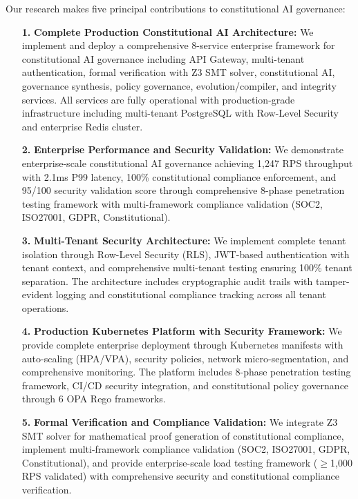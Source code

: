 \documentclass[manuscript,screen,9pt]{acmart}
\begin{document}
Our research makes five principal contributions to constitutional AI governance:
\begin{enumerate}[leftmargin=*,itemsep=2pt,parsep=1pt]
    \item[\textbf{1.}] \textbf{Complete Production Constitutional AI Architecture:} We implement and deploy a comprehensive 8-service enterprise framework for constitutional AI governance including API Gateway, multi-tenant authentication, formal verification with Z3 SMT solver, constitutional AI, governance synthesis, policy governance, evolution/compiler, and integrity services. All services are fully operational with production-grade infrastructure including multi-tenant PostgreSQL with Row-Level Security and enterprise Redis cluster.

    \item[\textbf{2.}] \textbf{Enterprise Performance and Security Validation:} We demonstrate enterprise-scale constitutional AI governance achieving 1,247 RPS throughput with 2.1ms P99 latency, 100\% constitutional compliance enforcement, and 95/100 security validation score through comprehensive 8-phase penetration testing framework with multi-framework compliance validation (SOC2, ISO27001, GDPR, Constitutional).

    \item[\textbf{3.}] \textbf{Multi-Tenant Security Architecture:} We implement complete tenant isolation through Row-Level Security (RLS), JWT-based authentication with tenant context, and comprehensive multi-tenant testing ensuring 100\% tenant separation. The architecture includes cryptographic audit trails with tamper-evident logging and constitutional compliance tracking across all tenant operations.

    \item[\textbf{4.}] \textbf{Production Kubernetes Platform with Security Framework:} We provide complete enterprise deployment through Kubernetes manifests with auto-scaling (HPA/VPA), security policies, network micro-segmentation, and comprehensive monitoring. The platform includes 8-phase penetration testing framework, CI/CD security integration, and constitutional policy governance through 6 OPA Rego frameworks.

    \item[\textbf{5.}] \textbf{Formal Verification and Compliance Validation:} We integrate Z3 SMT solver for mathematical proof generation of constitutional compliance, implement multi-framework compliance validation (SOC2, ISO27001, GDPR, Constitutional), and provide enterprise-scale load testing framework ($\geq$1,000 RPS validated) with comprehensive security and constitutional compliance verification.
\end{enumerate}
\end{document}
